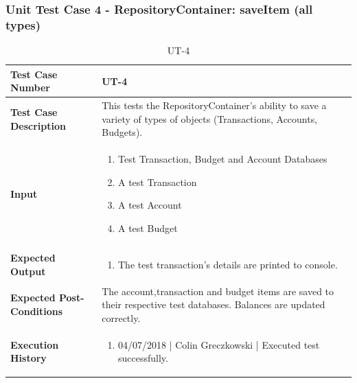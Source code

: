 \documentclass[12pt]{article}
\begin{document}
\subsubsection{Unit Test Case 4 - RepositoryContainer: saveItem (all types)}
\def\arraystretch{1.5}%
\begin{table}[htbp]
\centering
\caption {UT-4}
\label{UT-4}
\begin{tabularx}{\textwidth}{ | l | X |}
\hline
\textbf{Test Case Number}      &  UT-4                         \\ \hline
\textbf{Test Case Description}    &  This tests the RepositoryContainer's ability to save a variety of types of objects (Transactions, Accounts, Budgets).                \\ \hline
\textbf{Input}         & 	\begin{enumerate}
          \item Test Transaction, Budget and Account Databases
	\item A test Transaction
	\item A test Account
	\item A test Budget
\end{enumerate} \\ \hline

\textbf{Expected Output}     & \begin{enumerate}
	\item The test transaction's details are printed to console.
\end{enumerate} \\ \hline
\textbf{Expected Post-Conditions}           & The account,transaction and budget items are saved to their respective test databases. Balances are updated correctly.                \\ \hline
\textbf{Execution History}   &  \begin{enumerate}
	\item 04/07/2018 | Colin Greczkowski | Executed test successfully.
\end {enumerate} \\ \hline
\end{tabularx}
\end{table}
\clearpage

\end{document}
